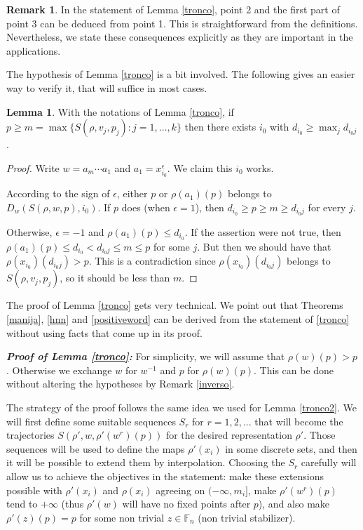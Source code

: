 \documentclass[12pt]{article}
\newcommand{\F}{\mathbb{F}}
\theoremstyle{definition}
\newtheorem{lem}[thm]{Lemma}
\newtheorem{rem}[thm]{Remark}
\newcommand{\vs}{\vspace{0.3cm}}
\begin{document}
\begin{rem} In the statement of Lemma \ref{tronco}, point 2 and the first part of point 3 can be deduced from point 1. This is straightforward from the definitions. Nevertheless, we state these consequences explicitly as they are important in the applications.
\end{rem}

The hypothesis of Lemma \ref{tronco} is a bit involved. The following gives an easier way to verify it, that will suffice in most cases.

\begin{lem}\label{increasing} With the notations of Lemma \ref{tronco}, if $p\geq m = \max\{S(\rho,v_j,p_j):j=1,\ldots,k\}$ then there exists $i_0$ with $d_{i_0}\geq \max_j d_{i_0j}$.
\end{lem}
\begin{proof} Write $w=a_m\cdots a_1$ and $a_1 = x_{i_0}^{\epsilon}$. We claim this $i_0$ works. 

According to the sign of $\epsilon$, either $p$ or $\rho(a_1)(p)$ belongs to $D_w(S(\rho,w,p),i_0)$. If $p$ does (when $\epsilon =1$), then $d_{i_0}\geq p \geq m \geq  d_{i_0j}$ for every $j$. 

Otherwise, $\epsilon =-1$ and $\rho(a_1)(p)\leq d_{i_0}$. If the assertion were not true, then $\rho(a_1)(p)\leq d_{i_0}<  d_{i_0j}\leq m \leq p$ for some $j$. But then we should have that $\rho(x_{i_0})(d_{i_0j})> p$. This is a contradiction since $\rho(x_{i_0})( d_{i_0j})$ belongs to $S(\rho,v_j,p_j)$, so it should be less than $m$. 

\end{proof}






The proof of Lemma \ref{tronco} gets very technical. We point out that Theorems \ref{manija}, \ref{hnn} and \ref{positiveword} can be derived from the statement of \ref{tronco} without using facts that come up in its proof. 
\vs

{\bf \em Proof of Lemma \ref{tronco}:} For simplicity, we will assume that $\rho(w)(p)>p$. 
Otherwise we exchange $w$ for $w^{-1}$ and $p$ for $\rho(w)(p)$. This can be done without altering the hypotheses by Remark \ref{inverso}. %

The strategy of the proof follows the same idea we used for Lemma \ref{tronco2}. We will first define some suitable sequences $S_r$ for $r=1,2,...$ that will become the trajectories $S(\rho',w,\rho'(w^r)(p))$ for the desired representation $\rho'$. Those sequences will be used to define the maps $\rho'(x_i)$ in some discrete sets, and then it will be possible to extend them by interpolation. Choosing the $S_r$ carefully will allow us to achieve the objectives in the statement: make these extensions possible with $\rho'(x_i)$ and $\rho(x_i)$ agreeing on $(-\infty,m_i]$,  make $\rho'(w^r)(p)$ tend to $+\infty$ (thus $\rho'(w)$ will have no fixed points after $p$), and also make $\rho'(z)(p)=p$ for some non trivial $z\in\F_n$ (non trivial stabilizer). 
\end{document}
